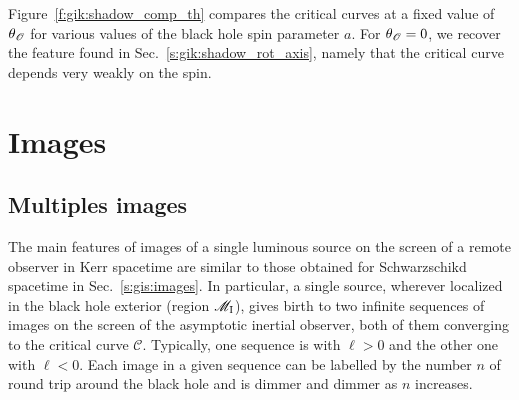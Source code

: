 Figure~\ref{f:gik:shadow_comp_th} compares the critical curves at a fixed
value of $\theta_{\mathscr{O}}$ for various values of the black hole spin parameter $a$.
For $\theta_{\mathscr{O}}=0$, we recover the feature found in Sec.~\ref{s:gik:shadow_rot_axis},
namely that the critical curve depends very weakly on the spin.



\section{Images} \label{s:gik:images}

\subsection{Multiples images}

The main features of images of a single luminous source on the screen of a remote observer in Kerr spacetime are similar to those obtained for Schwarzschikd spacetime in Sec.~\ref{s:gis:images}.
In particular, a single source, wherever localized in the black hole exterior (region $\mathscr{M}_{\rm I}$),
gives birth to two infinite sequences of images on the screen of the asymptotic inertial observer,
both of them converging to the critical curve $\mathscr{C}$. Typically, one sequence is with
$\ell>0$ and the other one with $\ell < 0$.
Each image in a given sequence can be labelled by the number $n$ of round trip around the black hole
and is dimmer and dimmer as $n$ increases.


